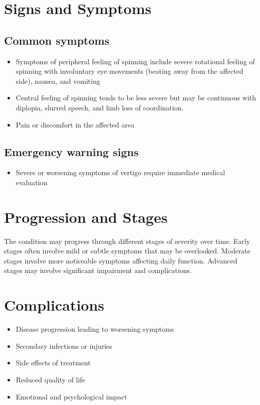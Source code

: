\section{Signs and Symptoms}

\subsection{Common symptoms}
\begin{itemize}[noitemsep]
  \item Symptoms of peripheral feeling of spinning include severe rotational feeling of spinning with involuntary eye movements (beating away from the affected side), nausea, and vomiting
  \item Central feeling of spinning tends to be less severe but may be continuous with diplopia, slurred speech, and limb loss of coordination.
  \item Pain or discomfort in the affected area
  \end{itemize}

\subsection{Emergency warning signs}
\begin{itemize}[noitemsep]
  \item Severe or worsening symptoms of vertigo require immediate medical evaluation
\end{itemize}
\section{Progression and Stages}
The condition may progress through different stages of severity over time. Early stages often involve mild or subtle symptoms that may be overlooked. Moderate stages involve more noticeable symptoms affecting daily function. Advanced stages may involve significant impairment and complications.
\section{Complications}
\begin{itemize}[noitemsep]
  \item Disease progression leading to worsening symptoms
  \item Secondary infections or injuries
  \item Side effects of treatment
  \item Reduced quality of life
  \item Emotional and psychological impact
\end{itemize}
